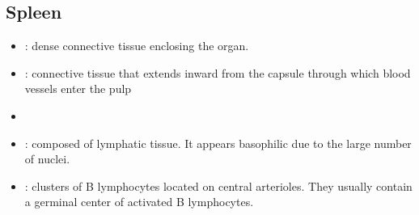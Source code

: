 \begin{itemize}
  \subsection{Spleen}\label{Spleen}
  \begin{multicols}{2}
  \begin{itemize}
    \item {}: dense connective tissue enclosing the organ.
    
    \begin{center}
    \end{center}
    
    \item {}:  connective tissue that extends inward from the capsule through which blood vessels enter the pulp
    
    \begin{center}
    \end{center}
    
    \item {}
    
    \begin{center}
    \end{center}
    
    \item {}: composed of lymphatic tissue. It appears basophilic due to the large number of nuclei.
    
    \begin{center}
    \end{center}
    
    \item {}: clusters of B lymphocytes located on central arterioles. They usually contain a germinal center of activated B lymphocytes.
    
    \begin{center}
    \end{center}


\end{itemize}
\end{multicols}
\end{itemize}
